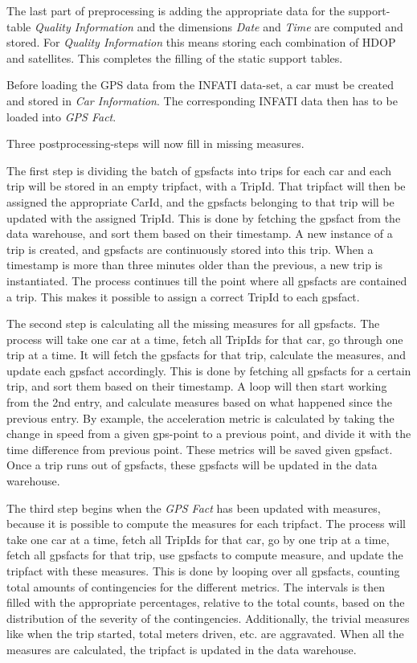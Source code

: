 The last part of preprocessing is adding the appropriate data for the support-table \textit{Quality Information} and the dimensions \textit{Date} and \textit{Time} are computed and stored. For \textit{Quality Information} this means storing each combination of HDOP and satellites. This completes the filling of the static support tables.

Before loading the GPS data from the INFATI data-set, a car must be created and stored in \textit{Car Information}. The corresponding INFATI data then has to be loaded into \textit{GPS Fact}. 

Three postprocessing-steps will now fill in missing measures.

The first step is dividing the batch of gpsfacts into trips for each car and each trip will be stored in an empty tripfact, with a TripId. That tripfact will then be assigned the appropriate CarId, and the gpsfacts belonging to that trip will be updated with the assigned TripId. This is done by fetching the gpsfact from the data warehouse, and sort them based on their timestamp. A new instance of a trip is created, and gpsfacts are continuously stored into this trip. When a timestamp is more than three minutes older than the previous, a new trip is instantiated. The process continues till the point where all gpsfacts are contained a trip. This makes it possible to  assign a correct TripId to each gpsfact.

The second step is calculating all the missing measures for all gpsfacts. The process will take one car at a time, fetch all TripIds for that car, go through one trip at a time. It will fetch the gpsfacts for that trip, calculate the measures, and update each gpsfact accordingly. This is done by fetching all gpsfacts for a certain trip, and sort them based on their timestamp. A loop will then start working from the 2nd entry, and calculate measures based on what happened since the previous entry.  By example, the acceleration metric is calculated by taking the change in speed from a given gps-point to a previous point, and divide it with the time difference from previous point. These metrics will be saved given gpsfact. Once a trip runs out of gpsfacts, these gpsfacts will be updated in the data warehouse.

The third step begins when the \textit{GPS Fact} has been updated with measures, because it is possible to compute the measures for each tripfact. The process will take one car at a time, fetch all TripIds for that car, go by one trip at a time, fetch all gpsfacts for that trip, use gpsfacts to compute measure, and update the tripfact with these measures. This is done by looping over all gpsfacts, counting total amounts of contingencies for the different metrics. The intervals is then filled with the appropriate percentages, relative to the total counts, based on the distribution of the severity of the contingencies. Additionally, the trivial measures like when the trip started, total meters driven, etc. are aggravated. When all the measures are calculated, the tripfact is updated in the data warehouse.

